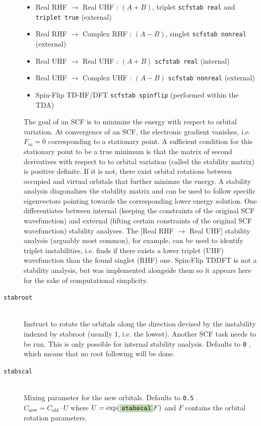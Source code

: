 \documentclass[bibliography=totocnumbered,a4paper,10pt,oneside]{scrbook}
\newcommand{\ttt}[1]{%
  \begingroup\setlength{\fboxsep}{1pt}%
  \colorbox{serenity-green!30}{\texttt{\hspace*{2pt}\vphantom{(g}#1\hspace*{2pt}}}%
  \endgroup
}
\begin{document}
\begin{description}
\begin{itemize}
      \item Real RHF $\rightarrow$ Real UHF    : $(A+B)$, triplet \ttt{scfstab real} and \ttt{triplet true} (external)
      \item Real RHF $\rightarrow$ Complex RHF : $(A-B)$, singlet \ttt{scfstab nonreal} (external)
      \item Real UHF $\rightarrow$ Real UHF    : $(A+B)$ \ttt{scfstab real} (internal)
      \item Real UHF $\rightarrow$ Complex UHF : $(A-B)$ \ttt{scfstab nonreal} (external)
      \item Spin-Flip TD-HF/DFT \ttt{scfstab spinflip} (performed within the TDA)
    \end{itemize}
    The goal of an SCF is to minimize the energy with respect to orbital variation. At convergence of an SCF, the electronic gradient vanishes,
    i.e. $F_{ia} = 0$ corresponding to a stationary point. A sufficient condition for this stationary point to be a true minimum is that the matrix of 
    second derivatives with respect to to orbital variation (called the stability matrix) is positive definite. If it is not, there exist orbital rotations
    between occupied and virtual orbitals that further minimze the energy. A stability analysis diagonalizes the stability matrix and can be used
    to follow specific eigenvectors pointing towards the corresponding lower energy solution.
    One differentiates between internal (keeping the constraints of the original SCF wavefunction) and external (lifting certain constraints of the original SCF wavefunction) stability analyses.
    The [Real RHF $\rightarrow$ Real UHF] stability analysis (arguably most common), for example, can be used to identify triplet instabilities, i.e. finds
    if there exists a lower triplet (UHF) wavefunction than the found singlet (RHF) one. Spin-Flip TDDFT is not a stability analysis, but was
    implemented alongside them so it appears here for the sake of computational simplicity.
    \item [\texttt{stabroot}]\hfill \\
    Instruct to rotate the orbitals along the direction devised by the instability indexed by stabroot (usually 1, i.e. the lowest). 
    Another SCF task needs to be run. This is only possible for internal stability analysis.
    Defaults to \ttt{0}, which means that no root following will be done.
    \item [\texttt{stabscal}]\hfill \\
    Mixing parameter for the new orbitals. Defaults to \ttt{0.5}.\\
    $C_\mathrm{new} = C_\mathrm{old} \cdot U $ where $U=\mathrm{exp}(\ttt{stabscal} F)$ and $F$ contains the orbital rotation parameters.
    \end{description}
\end{document}
